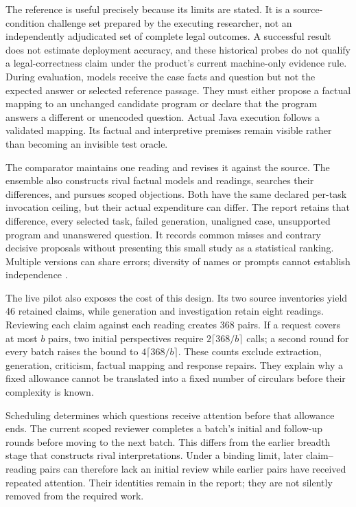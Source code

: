 \documentclass[12pt,a4paper,oneside,openany]{book}
\begin{document}
The reference is useful precisely because its limits are stated. It is a
source-condition challenge set prepared by the executing researcher, not an
independently adjudicated set of complete legal outcomes. A successful result
does not estimate deployment accuracy, and these historical probes do not
qualify a legal-correctness claim under the product's current machine-only
evidence rule. During evaluation, models receive the
case facts and question but not the expected answer or selected reference
passage. They must either propose a factual mapping to an unchanged candidate
program or declare that the program answers a different or unencoded question.
Actual Java execution follows a validated mapping. Its factual and interpretive
premises remain visible rather than becoming an invisible test oracle.

The comparator maintains one reading and revises it against the source. The
ensemble also constructs rival factual models and readings, searches their
differences, and pursues scoped objections. Both have the same declared per-task
invocation ceiling, but their actual expenditure can differ. The report retains
that difference, every selected task, failed generation, unaligned case,
unsupported program and unanswered question. It records common misses and
contrary decisive proposals without presenting this small study as a statistical
ranking. Multiple versions can share errors; diversity of names or prompts
cannot establish independence \citep{knight1986diversity,littlewood2001diversity}.

The live pilot also exposes the cost of this design. Its two source inventories
yield 46 retained claims, while generation and investigation retain eight
readings. Reviewing each claim against each reading creates 368 pairs. If a
request covers at most $b$ pairs, two initial perspectives require
$2\lceil 368/b\rceil$ calls; a second round for every batch raises the bound to
$4\lceil 368/b\rceil$. These counts exclude extraction, generation, criticism,
factual mapping and response repairs. They explain why a fixed allowance cannot
be translated into a fixed number of circulars before their complexity is known.

Scheduling determines which questions receive attention before that allowance
ends. The current scoped reviewer completes a batch's initial and follow-up
rounds before moving to the next batch. This differs from the earlier breadth
stage that constructs rival interpretations. Under a binding limit, later
claim--reading pairs can therefore lack an initial review while earlier pairs
have received repeated attention. Their identities remain in the report; they
are not silently removed from the required work.
\end{document}
